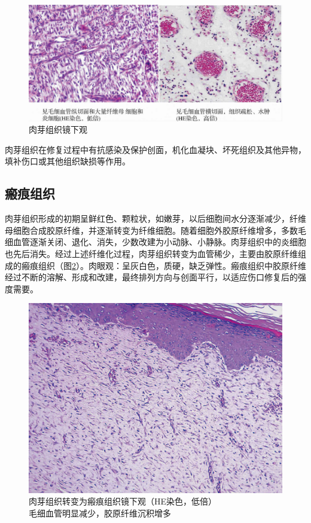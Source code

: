 \begin{figure}[!h]
	\begin{center}
		\includegraphics{./images/Image00027.jpg}
	\end{center}
	\captionsetup{justification=centering}
	\caption{肉芽组织镜下观}
	\label{fig2-4}
\end{figure}

肉芽组织在修复过程中有抗感染及保护创面，机化血凝块、坏死组织及其他异物，填补伤口或其他组织缺损等作用。

\subsection{瘢痕组织}

肉芽组织形成的初期呈鲜红色、颗粒状，如嫩芽，以后细胞间水分逐渐减少，纤维母细胞合成胶原纤维，并逐渐转变为纤维细胞。随着细胞外胶原纤维增多，多数毛细血管逐渐关闭、退化、消失，少数改建为小动脉、小静脉。肉芽组织中的炎细胞也先后消失。经过上述纤维化过程，肉芽组织转变为血管稀少，主要由胶原纤维组成的瘢痕组织（图\ref{fig2-5}）。肉眼观：呈灰白色，质硬，缺乏弹性。瘢痕组织中胶原纤维经过不断的溶解、形成和改建，最终排列方向与创面平行，以适应伤口修复后的强度需要。

\begin{figure}[!htbp]
	\centering
	\includegraphics{./images/Image00028.jpg}
	\caption{肉芽组织转变为瘢痕组织镜下观（HE染色，低倍） \\ {\small 毛细血管明显减少，胶原纤维沉积增多}}
	\label{fig2-5}
\end{figure}

